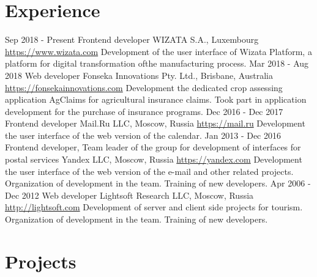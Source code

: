 \documentclass[11pt,a4paper]{moderncv}
\begin{document}
\newpage

\section{Experience}
\cventry
  {Sep 2018 - Present}
  {Frontend developer}
  {WIZATA S.A., Luxembourg}
  {\newline{}\url{https://www.wizata.com}}{}
  {Development of the user interface of Wizata Platform, a platform for digital transformation ofthe manufacturing process.}
\cventry
  {Mar 2018 - Aug 2018}
  {Web developer}
  {Fonseka Innovations Pty. Ltd., Brisbane, Australia}
  {\newline{}\url{https://fonsekainnovations.com}}{}
  {Development the dedicated crop assessing application AgClaims for agricultural insurance claims.
  Took part in application development for the purchase of insurance programs.}
\cventry
  {Dec 2016 - Dec 2017}
  {Frontend developer}
  {Mail.Ru LLC, Moscow, Russia}
  {\newline{}\url{https://mail.ru}}{}
  {Development the user interface of the web version of the calendar.}
\cventry
  {Jan 2013 - Dec 2016}
  {Frontend developer, Team leader of the group for development of interfaces for postal services}
  {Yandex LLC, Moscow, Russia}
  {\newline{}\url{https://yandex.com}}{}
  {Development the user interface of the web version of the e-mail and other related projects.
  Organization of development in the team.\newline{}
  Training of new developers.}
\cventry
  {Apr 2006 - Dec 2012}
  {Web developer}
  {Lightsoft Research LLC, Moscow, Russia}
  {\newline{}\url{http://lightsoft.com}}{}
  {Development of server and client side projects for tourism.\newline{}
  Organization of development in the team.\newline{}
  Training of new developers.}

\newpage

\section{Projects}
\end{document}
